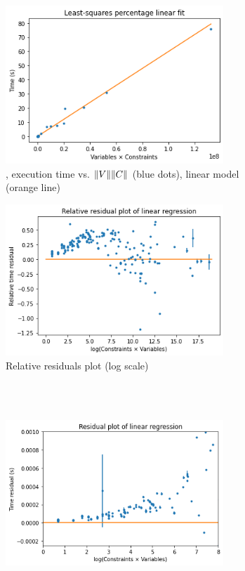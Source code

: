 \begin{figure}
\begin{subfigure}{0.475\textwidth}
\includegraphics[width=0.9\textwidth]{images/least-squares.png}
\caption{\solve, \RecCheck execution time vs. $\lVert V\rVert\lVert C\rVert$ (blue dots), linear model (orange line)}
\label{fig:stats:linregress}
\end{subfigure}
\hfill
\begin{subfigure}{0.475\textwidth}
\includegraphics[width=0.9\textwidth]{images/relative-residuals.png}
\caption{Relative residuals plot (log scale)}
\label{fig:stats:residuals}
\end{subfigure}
\\ \hfill \\
\begin{subfigure}{0.475\textwidth}
\includegraphics[width=0.9\textwidth]{images/residuals.png}

\end{subfigure}
\end{figure}
